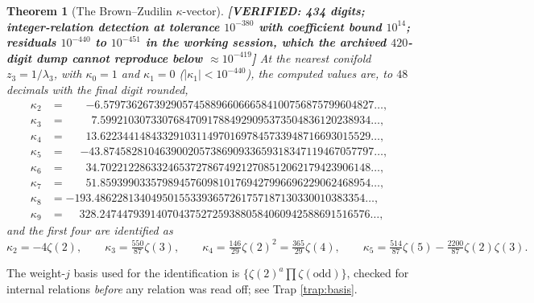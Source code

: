 \documentclass[11pt,reqno]{amsart}
\theoremstyle{plain}
\newtheorem{theorem}{Theorem}[section]
\theoremstyle{definition}
\theoremstyle{remark}
\newcommand{\VER}[1]{{\normalfont\sffamily\bfseries[VERIFIED: #1]}}
\begin{document}
\begin{theorem}[The Brown--Zudilin $\kappa$-vector]\label{thm:kappavec}
\VER{434 digits; integer-relation detection at tolerance $10^{-380}$ with coefficient bound
$10^{14}$; residuals $10^{-440}$ to $10^{-451}$ in the working session, which the archived
$420$-digit dump cannot reproduce below $\approx10^{-419}$}
At the nearest conifold $z_3=1/\lambda_3$, with $\kappa_0=1$ and $\kappa_1=0$
($|\kappa_1|<10^{-440}$), the computed values are, to $48$ decimals with the final digit
rounded,
{\small
\[
\begin{aligned}
  \kappa_2 &= \phantom{-00}{-6.579736267392905745889660666584100756875799604827}\ldots,\\
  \kappa_3 &= \phantom{-000}{7.599210307330768470917884929095373504836120238934}\ldots,\\
  \kappa_4 &= \phantom{-00}{13.622344148433291031149701697845733948716693015529}\ldots,\\
  \kappa_5 &= \phantom{-0}{-43.874582810463900205738690933659318347119467057797}\ldots,\\
  \kappa_6 &= \phantom{-00}{34.702212286332465372786749212708512062179423906148}\ldots,\\
  \kappa_7 &= \phantom{-00}{51.859399033579894576098101769427996696229062468954}\ldots,\\
  \kappa_8 &= {-193.486228134049501553393657261757187130330010383354}\ldots,\\
  \kappa_9 &= \phantom{-}{328.247447939140704375272593880584060942588691516576}\ldots,
\end{aligned}
\]}
and the first four are identified as
\[
  \kappa_2=-4\zeta(2),\qquad
  \kappa_3=\tfrac{550}{87}\zeta(3),\qquad
  \kappa_4=\tfrac{146}{29}\zeta(2)^2=\tfrac{365}{29}\zeta(4),\qquad
  \kappa_5=\tfrac{514}{87}\zeta(5)-\tfrac{2200}{87}\zeta(2)\zeta(3).
\]
\end{theorem}

The weight-$j$ basis used for the identification is
$\{\zeta(2)^a\prod\zeta(\text{odd})\}$, checked for internal relations \emph{before} any
relation was read off; see Trap \ref{trap:basis}.
\end{document}
